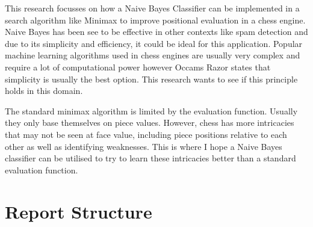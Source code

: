 \documentclass[11pt]{informatics-report}
\begin{document}
This research focusses on how a Naive Bayes Classifier can be implemented in a search algorithm like Minimax to improve positional evaluation in a chess engine. Naive Bayes has been see to be effective in other contexts like spam detection and due to its simplicity and efficiency, it could be ideal for this application. Popular machine learning algorithms used in chess engines are usually very complex and require a lot of computational power however Occams Razor states that simplicity is usually the best option. This research wants to see if this principle holds in this domain. 

The standard minimax algorithm is limited by the evaluation function. Usually they only base themselves on piece values. However, chess has more intricacies that may not be seen at face value, including piece positions relative to each other as well as identifying weaknesses. This is where I hope a Naive Bayes classifier can be utilised to try to learn these intricacies better than a standard evaluation function.




\section{Report Structure}















\appendix



\end{document}
